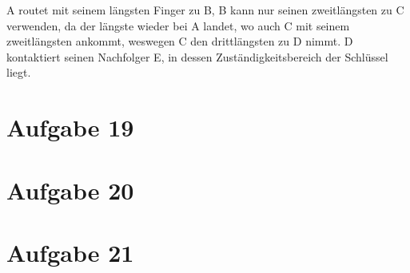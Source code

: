 \documentclass[10pt,a4paper]{article}
\begin{document}
A routet mit seinem längsten Finger zu B, B kann nur seinen zweitlängsten zu C verwenden, da der längste wieder bei A landet, wo auch C mit seinem zweitlängsten ankommt, weswegen C den drittlängsten zu D nimmt. D kontaktiert seinen Nachfolger E, in dessen Zuständigkeitsbereich der Schlüssel liegt.
\section*{Aufgabe 19}

\section*{Aufgabe 20}

\section*{Aufgabe 21}
\end{document}
